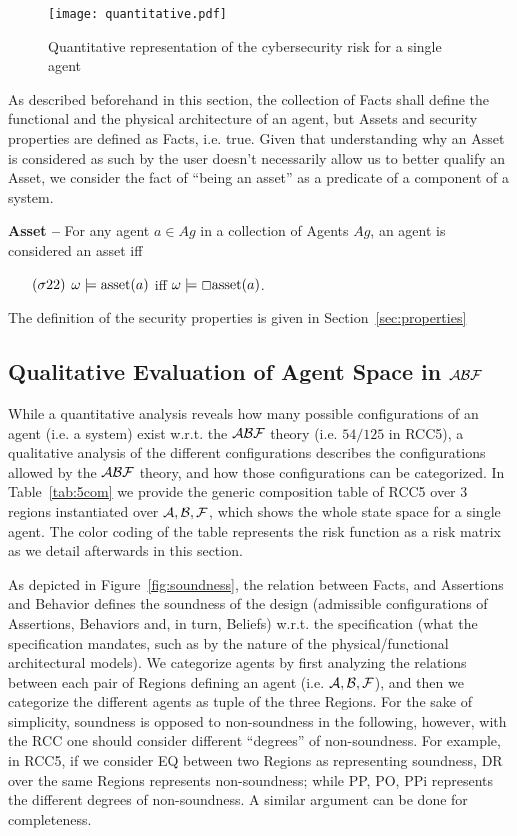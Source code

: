 \begin{figure}[t]
	\centering
	\texttt{[image: quantitative.pdf]}
	\caption{Quantitative representation of the cybersecurity risk for a single agent}
	\label{fig:quantitative}
\end{figure}

As described beforehand in this section, the collection of Facts shall define
the functional and the physical architecture of an agent, but Assets and
security properties are defined as Facts, i.e. true. Given that understanding
why an Asset is considered as such by the user doesn't necessarily allow
us to better qualify an Asset, we consider the fact of ``being an asset'' as
a predicate of a component of a system. 

\begin{definition}{\bf Asset --}\label{def:asset}
For any agent $a\in Ag$ in a collection of Agents $Ag$, an agent is considered an asset iff 
	\begin{enumerate}[noitemsep]
		\item[$(\sigma22)$] $\omega\models\text{asset}({a})$ iff
			$\omega\models \Box\text{asset}({a})$.
	\end{enumerate}
\end{definition}

The definition of the security properties is given in Section~\ref{sec:properties}

\subsection{Qualitative Evaluation of Agent Space in $\mathcal{A}\mathcal{B}\mathcal{F}$}\label{sec:agentspace}
While a quantitative analysis reveals how many possible configurations of an
agent (i.e. a system) exist w.r.t. the $\mathcal{A}\mathcal{B}\mathcal{F}$ theory (i.e. $54/125$ in RCC5), a
qualitative analysis of the different configurations describes
the configurations allowed by the $\mathcal{A}\mathcal{B}\mathcal{F}$ theory, and how those configurations can be
categorized.  In Table~\ref{tab:5com} we provide the generic composition table
of RCC5 over 3 regions instantiated over $\mathcal{A},\mathcal{B},\mathcal{F}$, which shows the whole state
space for a single agent. The color coding of the table represents the 
risk function as a risk matrix as we detail afterwards in this section.

As depicted in
Figure~\ref{fig:soundness}, the relation between Facts, and Assertions and Behavior
defines the soundness of the design (admissible configurations of Assertions,
Behaviors and, in turn, Beliefs) w.r.t. the specification (what the
specification mandates, such as by the nature of the physical/functional
architectural models). We categorize agents by first analyzing the relations
between each pair of Regions defining an agent (i.e. $\mathcal{A},\mathcal{B},\mathcal{F}$), and then we
categorize the different agents as tuple of the three Regions.
For the sake of simplicity, soundness is opposed to non-soundness in the following, however,
with the RCC one should consider different ``degrees'' of non-soundness. For example,
in RCC5, if we consider EQ between two Regions as representing soundness, DR over the same Regions
represents non-soundness; while PP, PO, PPi represents the different degrees of non-soundness.
A similar argument can be done for completeness.

